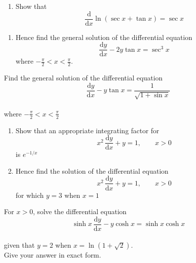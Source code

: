 \documentclass[leqno]{article}
\begin{document}
\begin{enumerate}[
  label=\textbf{\arabic*.},
  leftmargin=*,
  topsep=0pt,
  partopsep=0pt,
  parsep=0pt
]
\newpage

\questionitem

\begin{enumerate}[label=\textbf{(\alph*)}]
  \item Show that
  \[
  \frac{\mathrm{d}}{\mathrm{d}x}\ln(\sec x+\tan x)=\sec x
  \]
\end{enumerate}

\begin{enumerate}[label=\textbf{(\alph*)}, resume]
  \item Hence find the general solution of the differential equation
  \[
  \frac{\mathrm{d}y}{\mathrm{d}x}-2y\tan x=\sec^3 x
  \]
  where $-\frac{\pi}{2}<x<\frac{\pi}{2}$. 
\end{enumerate}

\newpage

\questionitem

Find the general solution of the differential equation\\
\[
\frac{\mathrm{d}y}{\mathrm{d}x} - y\tan x = \frac{1}{\sqrt{1+\sin x}}
\] \\
where $-\tfrac{\pi}{2} < x < \tfrac{\pi}{2}$ 

\newpage

\questionitem

\begin{enumerate}[label=\textbf{(\alph*)}]
  \item Show that an appropriate integrating factor for
  \[
  x^2\,\frac{\mathrm{d}y}{\mathrm{d}x}+y=1,\qquad x>0
  \]
  is $e^{-1/x}$  \\
  \item Hence find the solution of the differential equation
  \[
  x^2\,\frac{\mathrm{d}y}{\mathrm{d}x}+y=1,\qquad x>0
  \]
  for which $y=3$ when $x=1$  \\
\end{enumerate}

\newpage

\questionitem

For $x>0$, solve the differential equation\\
\[
\sinh x\,\frac{\mathrm{d}y}{\mathrm{d}x} - y\cosh x = \sinh x\cosh x
\] \\
given that $y = 2$ when $x = \ln(1+\sqrt{2})$. \\
Give your answer in exact form. 


\end{enumerate}
\end{document}
